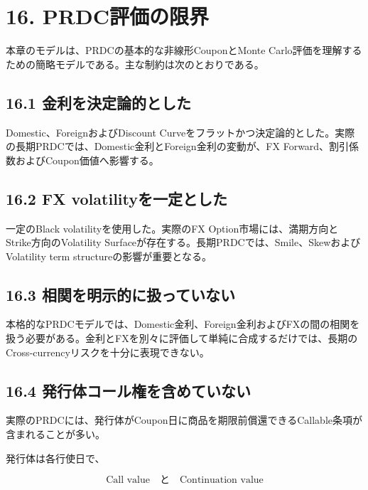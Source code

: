 \documentclass[
  letterpaper,
  DIV=11,
  numbers=noendperiod]{scrreprt}
\begin{document}
\section{16. PRDC評価の限界}\label{prdcux8a55ux4fa1ux306eux9650ux754c}

本章のモデルは、PRDCの基本的な非線形CouponとMonte
Carlo評価を理解するための簡略モデルである。主な制約は次のとおりである。

\subsection{16.1
金利を決定論的とした}\label{ux91d1ux5229ux3092ux6c7aux5b9aux8ad6ux7684ux3068ux3057ux305f}

Domestic、ForeignおよびDiscount
Curveをフラットかつ決定論的とした。実際の長期PRDCでは、Domestic金利とForeign金利の変動が、FX
Forward、割引係数およびCoupon価値へ影響する。

\subsection{16.2 FX
volatilityを一定とした}\label{fx-volatilityux3092ux4e00ux5b9aux3068ux3057ux305f}

一定のBlack volatilityを使用した。実際のFX
Option市場には、満期方向とStrike方向のVolatility
Surfaceが存在する。長期PRDCでは、Smile、SkewおよびVolatility term
structureの影響が重要となる。

\subsection{16.3
相関を明示的に扱っていない}\label{ux76f8ux95a2ux3092ux660eux793aux7684ux306bux6271ux3063ux3066ux3044ux306aux3044}

本格的なPRDCモデルでは、Domestic金利、Foreign金利およびFXの間の相関を扱う必要がある。金利とFXを別々に評価して単純に合成するだけでは、長期のCross-currencyリスクを十分に表現できない。

\subsection{16.4
発行体コール権を含めていない}\label{ux767aux884cux4f53ux30b3ux30fcux30ebux6a29ux3092ux542bux3081ux3066ux3044ux306aux3044}

実際のPRDCには、発行体がCoupon日に商品を期限前償還できるCallable条項が含まれることが多い。

発行体は各行使日で、

\[
\text{Call value}
\quad\text{と}\quad
\text{Continuation value}
\]
\end{document}
